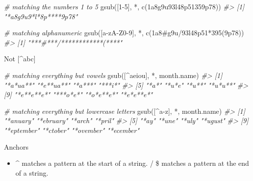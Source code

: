 \documentclass[
]{book}
\newenvironment{Shaded}{\begin{snugshade}}{\end{snugshade}}
\newcommand{\CommentTok}[1]{\textcolor[rgb]{0.56,0.35,0.01}{\textit{#1}}}
\newcommand{\FunctionTok}[1]{\textcolor[rgb]{0.00,0.00,0.00}{#1}}
\newcommand{\NormalTok}[1]{#1}
\newcommand{\StringTok}[1]{\textcolor[rgb]{0.31,0.60,0.02}{#1}}
\providecommand{\tightlist}{%
  \setlength{\itemsep}{0pt}\setlength{\parskip}{0pt}}
\begin{document}
\begin{Shaded}
\begin{Highlighting}[]
\CommentTok{\# matching the numbers 1 to 5}
\FunctionTok{gsub}\NormalTok{(}\StringTok{\textquotesingle{}[1{-}5]\textquotesingle{}}\NormalTok{, }\StringTok{\textquotesingle{}*\textquotesingle{}}\NormalTok{, }\FunctionTok{c}\NormalTok{(}\StringTok{\textquotesingle{}1a8g9u93l48p51359p78\textquotesingle{}}\NormalTok{))}
\CommentTok{\#\textgreater{} [1] "*a8g9u9*l*8p****9p78"}

\CommentTok{\# matching alphanumeric}
\FunctionTok{gsub}\NormalTok{(}\StringTok{\textquotesingle{}[a{-}zA{-}Z0{-}9]\textquotesingle{}}\NormalTok{, }\StringTok{\textquotesingle{}*\textquotesingle{}}\NormalTok{, }\FunctionTok{c}\NormalTok{(}\StringTok{\textquotesingle{}1a8\#g9u/93l48p51*395(9p78\textquotesingle{}}\NormalTok{))}
\CommentTok{\#\textgreater{} [1] "***\#***/************(****"}
\end{Highlighting}
\end{Shaded}

Not {[}\^{}abc{]}

\begin{Shaded}
\begin{Highlighting}[]
\CommentTok{\# matching everything but vowels}
\FunctionTok{gsub}\NormalTok{(}\StringTok{\textquotesingle{}[\^{}aeiou]\textquotesingle{}}\NormalTok{, }\StringTok{\textquotesingle{}*\textquotesingle{}}\NormalTok{, month.name)}
\CommentTok{\#\textgreater{}  [1] "*a*ua**"   "*e**ua**"  "*a***"     "***i*"    }
\CommentTok{\#\textgreater{}  [5] "*a*"       "*u*e"      "*u**"      "*u*u**"   }
\CommentTok{\#\textgreater{}  [9] "*e**e**e*" "***o*e*"   "*o*e**e*"  "*e*e**e*"}

\CommentTok{\# matching everything but lowercase letters}
\FunctionTok{gsub}\NormalTok{(}\StringTok{\textquotesingle{}[\^{}a{-}z]\textquotesingle{}}\NormalTok{, }\StringTok{\textquotesingle{}*\textquotesingle{}}\NormalTok{, month.name)}
\CommentTok{\#\textgreater{}  [1] "*anuary"   "*ebruary"  "*arch"     "*pril"    }
\CommentTok{\#\textgreater{}  [5] "*ay"       "*une"      "*uly"      "*ugust"   }
\CommentTok{\#\textgreater{}  [9] "*eptember" "*ctober"   "*ovember"  "*ecember"}
\end{Highlighting}
\end{Shaded}

Anchors

\begin{itemize}
\tightlist
\item
  \^{} matches a pattern at the start of a string.
  / \$ matches a pattern at the end of a string.
\end{itemize}
\end{document}
